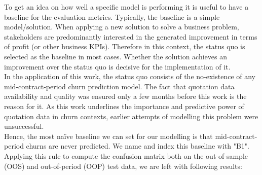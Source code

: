\documentclass[12pt,titlepage]{article}
\begin{document}
To get an idea on how well a specific model is performing it is useful to have a baseline for the evaluation metrics. Typically, the baseline is a simple model/solution. When applying a new solution to solve a business problem, stakeholders are predominantly interested in the generated improvement in terms of profit (or other business KPIs). Therefore in this context, the status quo is selected as the baseline in most cases. Whether the solution achieves an improvement over the status quo is decisive for the implementation of it. \\
In the application of this work, the status quo consists of the no-existence of any mid-contract-period churn prediction model. The fact that quotation data availability and quality was ensured only a few months before this work is the reason for it. As this work underlines the importance and predictive power of quotation data in churn contexts, earlier attempts of modelling this problem were unsuccessful. \\
Hence, the most naïve baseline we can set for our modelling is that mid-contract-period churns are never predicted. We name and index this baseline with "B1". Applying this rule to compute the confusion matrix both on the out-of-sample (OOS) and out-of-period (OOP) test data, we are left with following results: \\
\noindent
\end{document}
